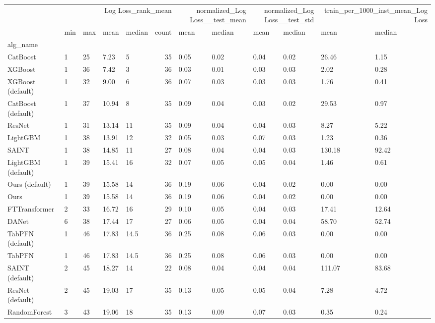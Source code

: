 \begin{tabular}{lllllrllllll}
\toprule
 & \multicolumn{5}{r}{Log Loss_rank_mean} & \multicolumn{2}{r}{normalized_Log Loss__test_mean} & \multicolumn{2}{r}{normalized_Log Loss__test_std} & \multicolumn{2}{r}{train_per_1000_inst_mean_Log Loss} \\
 & min & max & mean & median & count & mean & median & mean & median & mean & median \\
alg_name &  &  &  &  &  &  &  &  &  &  &  \\
\midrule
CatBoost & 1 & 25 & 7.23 & 5 & 35 & 0.05 & 0.02 & 0.04 & 0.02 & 26.46 & 1.15 \\
XGBoost & 1 & 36 & 7.42 & 3 & 36 & 0.03 & 0.01 & 0.03 & 0.03 & 2.02 & 0.28 \\
XGBoost (default) & 1 & 32 & 9.00 & 6 & 36 & 0.07 & 0.03 & 0.03 & 0.03 & 1.76 & 0.41 \\
CatBoost (default) & 1 & 37 & 10.94 & 8 & 35 & 0.09 & 0.04 & 0.03 & 0.02 & 29.53 & 0.97 \\
ResNet & 1 & 31 & 13.14 & 11 & 35 & 0.09 & 0.04 & 0.04 & 0.03 & 8.27 & 5.22 \\
LightGBM & 1 & 38 & 13.91 & 12 & 32 & 0.05 & 0.03 & 0.07 & 0.03 & 1.23 & 0.36 \\
SAINT & 1 & 38 & 14.85 & 11 & 27 & 0.08 & 0.04 & 0.04 & 0.03 & 130.18 & 92.42 \\
LightGBM (default) & 1 & 39 & 15.41 & 16 & 32 & 0.07 & 0.05 & 0.05 & 0.04 & 1.46 & 0.61 \\
Ours (default) & 1 & 39 & 15.58 & 14 & 36 & 0.19 & 0.06 & 0.04 & 0.02 & 0.00 & 0.00 \\
Ours & 1 & 39 & 15.58 & 14 & 36 & 0.19 & 0.06 & 0.04 & 0.02 & 0.00 & 0.00 \\
FTTransformer & 2 & 33 & 16.72 & 16 & 29 & 0.10 & 0.05 & 0.04 & 0.03 & 17.41 & 12.64 \\
DANet & 6 & 38 & 17.44 & 17 & 27 & 0.06 & 0.05 & 0.04 & 0.04 & 58.70 & 52.74 \\
TabPFN (default) & 1 & 46 & 17.83 & 14.5 & 36 & 0.25 & 0.08 & 0.06 & 0.03 & 0.00 & 0.00 \\
TabPFN & 1 & 46 & 17.83 & 14.5 & 36 & 0.25 & 0.08 & 0.06 & 0.03 & 0.00 & 0.00 \\
SAINT (default) & 2 & 45 & 18.27 & 14 & 22 & 0.08 & 0.04 & 0.04 & 0.04 & 111.07 & 83.68 \\
ResNet (default) & 2 & 45 & 19.03 & 17 & 35 & 0.13 & 0.05 & 0.05 & 0.04 & 7.28 & 4.72 \\
RandomForest & 3 & 43 & 19.06 & 18 & 35 & 0.13 & 0.09 & 0.07 & 0.03 & 0.35 & 0.24 \\

\end{tabular}
